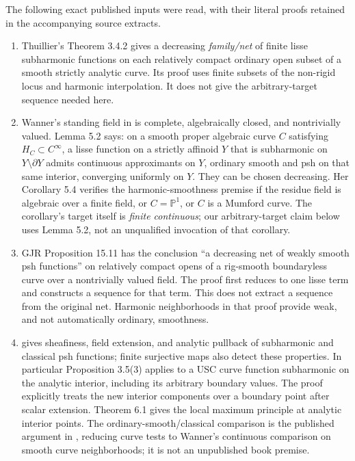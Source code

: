 \documentclass[11pt]{article}
\theoremstyle{remark}
\begin{document}
The following exact published inputs were read, with their literal proofs
retained in the accompanying source extracts.
\begin{enumerate}
\item Thuillier's Theorem 3.4.2 \cite{Thu} gives a decreasing \emph{family/net}
of finite lisse subharmonic functions on each relatively compact ordinary
open subset of a smooth strictly analytic curve. Its proof uses finite
subsets of the non-rigid locus and harmonic interpolation. It does not give
the arbitrary-target sequence needed here.
\item Wanner's standing field in \cite{Wan} is complete, algebraically
closed, and nontrivially valued. Lemma 5.2 says: on a smooth proper algebraic
curve $C$ satisfying $H_C\subset C^\infty$, a lisse function on a strictly
affinoid $Y$ that is subharmonic on $Y\setminus\partial Y$ admits continuous
approximants on $Y$, ordinary smooth and psh on that same interior, converging
uniformly on $Y$. They can be chosen decreasing. Her Corollary 5.4 verifies
the harmonic-smoothness premise if the residue field is algebraic over a
finite field, or $C=\mathbb P^1$, or $C$ is a Mumford curve. The corollary's
target itself is \emph{finite continuous}; our arbitrary-target claim below
uses Lemma 5.2, not an unqualified invocation of that corollary.
\item GJR Proposition 15.11 \cite{GJR} has the conclusion ``a decreasing net
of weakly smooth psh functions'' on relatively compact opens of a rig-smooth
boundaryless curve over a nontrivially valued field. The proof first reduces
to one lisse term and constructs a sequence for that term. This does not
extract a sequence from the original net. Harmonic neighborhoods in that
proof provide weak, and not automatically ordinary, smoothness.
\item \cite[Propositions 3.5 and 4.2]{GR} gives sheafiness, field extension,
and analytic pullback of subharmonic and classical psh functions; finite
surjective maps also detect these properties. In particular Proposition
3.5(3) applies to a USC curve function subharmonic on the analytic interior,
including its arbitrary boundary values. The proof explicitly treats the
new interior components over a boundary point after scalar extension.
Theorem 6.1 gives the local maximum principle at analytic interior points.
The ordinary-smooth/classical comparison is the published argument in
\cite[1.2]{GR}, reducing curve tests to Wanner's continuous comparison on
smooth curve neighborhoods; it is not an unpublished book premise.
\end{enumerate}
\end{document}
